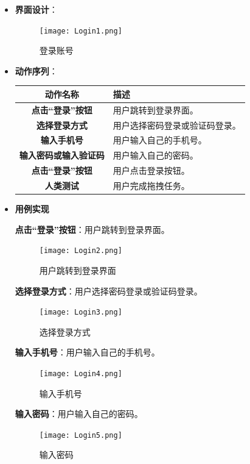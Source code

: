 \begin{itemize}
	\item \textbf{界面设计}：
	\begin{figure}[H]
		\centering
		\texttt{[image: Login1.png]}
		\caption{登录账号}
	\end{figure}
	\item \textbf{动作序列}：
	\begin{table}[H]
		\centering
		\renewcommand\arraystretch{1.5}
		\begin{tabular}{|c|>{\raggedright\arraybackslash}p{10cm}|}
			\hline
			\textbf{动作名称} & \textbf{描述} \\ \hline
			\textbf{点击“登录”按钮} & 用户跳转到登录界面。\\ \hline
			\textbf{选择登录方式} & 用户选择密码登录或验证码登录。\\ \hline
			\textbf{输入手机号} & 用户输入自己的手机号。\\ \hline
			\textbf{输入密码或输入验证码} & 用户输入自己的密码。\\ \hline
			\textbf{点击“登录”按钮} & 用户点击登录按钮。\\ \hline
			\textbf{人类测试} & 用户完成拖拽任务。\\ \hline
		\end{tabular}
	\end{table}

	\item \textbf{用例实现}

	\textbf{点击“登录”按钮}：用户跳转到登录界面。

	\begin{figure}[H]
		\centering
		\texttt{[image: Login2.png]}
		\caption{用户跳转到登录界面}
	\end{figure}

	\textbf{选择登录方式}：用户选择密码登录或验证码登录。

	\begin{figure}[H]
		\centering
		\texttt{[image: Login3.png]}
		\caption{选择登录方式}
	\end{figure}

	\textbf{输入手机号}：用户输入自己的手机号。

	\begin{figure}[H]
		\centering
		\texttt{[image: Login4.png]}
		\caption{输入手机号}
	\end{figure}

	\textbf{输入密码}：用户输入自己的密码。

	\begin{figure}[H]
		\centering
		\texttt{[image: Login5.png]}
		\caption{输入密码}
	\end{figure}


\end{itemize}
